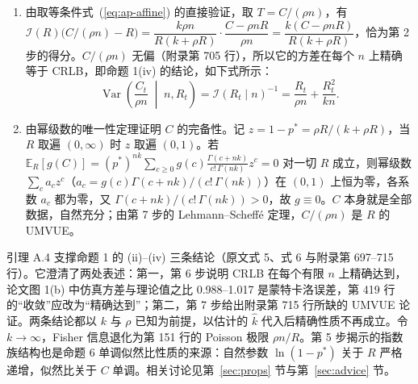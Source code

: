 \begin{enumerate}
\begin{equation*}
\tag{原文式 5}
\end{equation*}
\item 由取等条件式~(\ref{eq:ap-affine}) 的直接验证，取 $T=C/(\rho n)$，有 $\mathcal I(R)\big(C/(\rho n)-R\big)=\dfrac{k\rho n}{R(k+\rho R)}\cdot\dfrac{C-\rho nR}{\rho n}=\dfrac{k(C-\rho nR)}{R(k+\rho R)}$，恰为第 2 步的得分。$C/(\rho n)$ 无偏（附录第 705 行），所以它的方差在每个 $n$ 上精确等于 CRLB，即命题 1(iv) 的结论，如下式所示：
\begin{equation*}
\operatorname{Var}\!\left(\frac{C_t}{\rho n} \;\middle|\; n, R_t\right) = \mathcal{I}(R_t \mid n)^{-1} = \frac{R_t}{\rho n} + \frac{R_t^2}{k n}.
\tag{原文式 6}
\end{equation*}
\item 由幂级数的唯一性定理证明 $C$ 的完备性。记 $z=1-p^*=\rho R/(k+\rho R)$，当 $R$ 取遍 $(0,\infty)$ 时 $z$ 取遍 $(0,1)$。若 $\mathbb{E}_R[g(C)]=(p^*)^{nk}\sum_{c\ge0}g(c)\frac{\Gamma(c+nk)}{c!\,\Gamma(nk)}z^{c}=0$ 对一切 $R$ 成立，则幂级数 $\sum_c a_cz^c$（$a_c=g(c)\Gamma(c+nk)/(c!\,\Gamma(nk))$）在 $(0,1)$ 上恒为零，各系数 $a_c$ 都为零，又 $\Gamma(c+nk)/(c!\,\Gamma(nk))>0$，故 $g\equiv0$。$C$ 本身就是全部数据，自然充分；由第 7 步的 Lehmann--Scheffé 定理，$C/(\rho n)$ 是 $R$ 的 UMVUE。
\end{enumerate}

引理 A.4 支撑命题 1 的 (ii)--(iv) 三条结论（原文式 5、式 6 与附录第 697--715 行）。它澄清了两处表述：第一，第 6 步说明 CRLB 在每个有限 $n$ 上精确达到，论文图 1(b) 中仿真方差与理论值之比 0.988--1.017 是蒙特卡洛误差，第 419 行的“收敛”应改为“精确达到”；第二，第 7 步给出附录第 715 行所缺的 UMVUE 论证。两条结论都以 $k$ 与 $\rho$ 已知为前提，以估计的 $\hat k$ 代入后精确性质不再成立。令 $k\to\infty$，Fisher 信息退化为第 151 行的 Poisson 极限 $\rho n/R$。第 5 步揭示的指数族结构也是命题 6 单调似然比性质的来源：自然参数 $\ln(1-p^*)$ 关于 $R$ 严格递增，似然比关于 $C$ 单调。相关讨论见第~\ref{sec:props} 节与第~\ref{sec:advice} 节。
